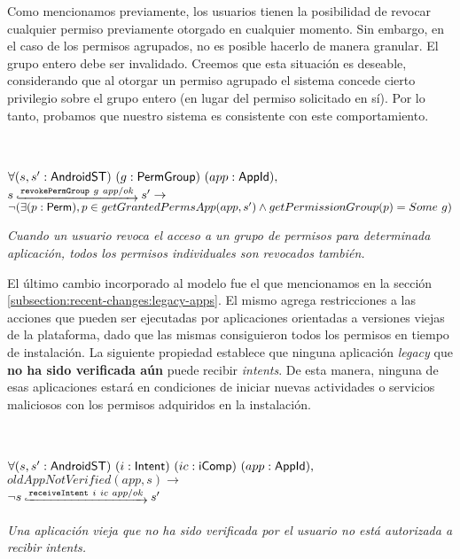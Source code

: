 Como mencionamos previamente, los usuarios tienen la posibilidad de revocar cualquier permiso
previamente otorgado en cualquier momento. Sin embargo, en el caso de los permisos agrupados, no es
posible hacerlo de manera granular. El grupo entero debe ser invalidado. Creemos que esta situación
es deseable, considerando que al otorgar un permiso agrupado el sistema concede cierto privilegio
sobre el grupo entero (en lugar del permiso solicitado en sí). Por lo tanto, probamos que nuestro
sistema es consistente con este comportamiento.

\begin{prop} \label{section:formalization:property4} \mbox{} \\ \\
    $\forall (s,s': \mathsf{AndroidST})~(g:\mathsf{PermGroup})~(app:\mathsf{AppId}),$ \\
    $\Mathexecrel{s}{\texttt{revokePermGroup}~g~app/ok}{s'} \rightarrow$ \\
    $\neg (\exists (p: \mathsf{Perm}), p \in getGrantedPermsApp(app,s')~ \\
    \land getPermissionGroup(p) = Some\ g) \\ \\$

    \textit{Cuando un usuario revoca el acceso a un grupo de permisos para determinada aplicación, todos los permisos individuales son revocados también.}
\end{prop}

El último cambio incorporado al modelo fue el que mencionamos en la sección
\ref{subsection:recent-changes:legacy-apps}. El mismo agrega restricciones a las acciones que pueden
ser ejecutadas por aplicaciones orientadas a versiones viejas de la plataforma, dado que las mismas
consiguieron todos los permisos en tiempo de instalación. La siguiente propiedad establece que
ninguna aplicación \textit{legacy} que \textbf{no ha sido verificada aún} puede recibir
\textit{intents}. De esta manera, ninguna de esas aplicaciones estará en condiciones de iniciar
nuevas actividades o servicios maliciosos con los permisos adquiridos en la instalación.

\begin{prop} \label{section:formalization:property5} \mbox{} \\ \\
    $\forall (s,s': \mathsf{AndroidST})~(i:\mathsf{Intent})~(ic:\mathsf{iComp})~(app:\mathsf{AppId}),$ \\
    $oldAppNotVerified(app, s) \rightarrow$ \\
    $\neg \Mathexecrel{s}{\texttt{receiveIntent}~i~ic~app/ok}{s'}$ \\ \\

    \textit{Una aplicación vieja que no ha sido verificada por el usuario no está autorizada a recibir intents.}
\end{prop}


